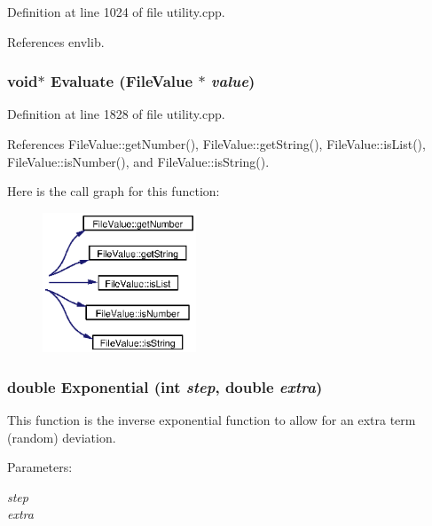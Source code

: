 Definition at line 1024 of file utility.cpp.

References envlib.
\subsubsection{\setlength{\rightskip}{0pt plus 5cm}void$\ast$ Evaluate ({\bf File\-Value} $\ast$ {\em value})}\label{utility_8cpp_a34}




Definition at line 1828 of file utility.cpp.

References File\-Value::get\-Number(), File\-Value::get\-String(), File\-Value::is\-List(), File\-Value::is\-Number(), and File\-Value::is\-String().

Here is the call graph for this function:\begin{figure}[H]
\begin{center}
\leavevmode
\includegraphics[width=130pt]{utility_8cpp_a34_cgraph}
\end{center}
\end{figure}
\subsubsection{\setlength{\rightskip}{0pt plus 5cm}double Exponential (int {\em step}, double {\em extra})}\label{utility_8cpp_a30}


This function is the inverse exponential function to allow for an extra term (random) deviation. \begin{Desc}
\item[Parameters:]
\begin{description}
\item[{\em step}]\item[{\em extra}]\end{description}
\end{Desc}


